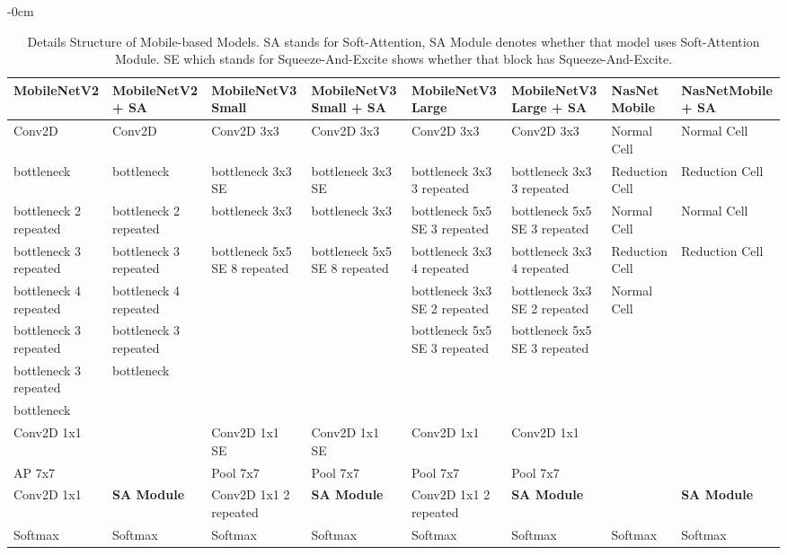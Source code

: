 \documentclass[sensors,article,submit,pdftex,moreauthors]{Definitions/mdpi}
\begin{document}
	\begin{table}[H]
		\begin{adjustwidth}{-\extralength}{0cm}
			\begin{tabularx}{\fulllength}{p{1.8cm} | p{1.8cm} | p{1.9cm} | p{1.9cm} | p{1.9cm} | p{1.8cm} | p{1.8cm} | p{1.9cm}}
				\toprule
				\textbf{MobileNetV2} & \textbf{MobileNetV2 + SA} & \textbf{MobileNetV3 Small} & \textbf{MobileNetV3 Small + SA} & \textbf{MobileNetV3 Large} & \textbf{MobileNetV3 Large + SA} & \textbf{NasNet Mobile} & \textbf{NasNetMobile + SA}\\
				\midrule
				Conv2D & Conv2D& Conv2D 3x3& Conv2D 3x3& Conv2D 3x3& Conv2D 3x3 & Normal Cell & Normal Cell\\	\hline		
				bottleneck & bottleneck & bottleneck 3x3 SE& bottleneck 3x3 SE& bottleneck 3x3 3 repeated& bottleneck 3x3 3 repeated& Reduction Cell& Reduction Cell\\ \hline					
				bottleneck 2 repeated& bottleneck 2 repeated& bottleneck 3x3& bottleneck 3x3& bottleneck 5x5 SE 3 repeated& bottleneck 5x5 SE 3 repeated & Normal Cell & Normal Cell\\ \hline	
				bottleneck 3 repeated& bottleneck 3 repeated& bottleneck 5x5 SE 8 repeated& bottleneck 5x5 SE 8 repeated& bottleneck 3x3 4 repeated& bottleneck 3x3 4 repeated& Reduction Cell & Reduction Cell\\ \hline	
				bottleneck 4 repeated& bottleneck 4 repeated& & & bottleneck 3x3 SE 2 repeated& bottleneck 3x3 SE 2 repeated & Normal Cell\\ \hline	
				bottleneck 3 repeated& bottleneck 3 repeated& & & bottleneck 5x5 SE 3 repeated& bottleneck 5x5 SE 3 repeated& \\ \hline	
				bottleneck 3 repeated& bottleneck & & & & & \\ \hline	
				bottleneck & & & & & & \\ \hline
				Conv2D 1x1 & & Conv2D 1x1 SE & Conv2D 1x1 SE& Conv2D 1x1& Conv2D 1x1 & & \\ \hline
				AP 7x7 & & Pool 7x7& Pool 7x7& Pool 7x7& Pool 7x7& &\\ \hline
				Conv2D 1x1 & \textbf{SA Module}& Conv2D 1x1 2 repeated& \textbf{SA Module}& Conv2D 1x1 2 repeated& \textbf{SA Module}& &\textbf{SA Module}\\ \hline
				Softmax & Softmax& Softmax& Softmax& Softmax& Softmax& Softmax & Softmax\\ 
				\bottomrule
			\end{tabularx}
		\end{adjustwidth}
		\caption{Details Structure of Mobile-based Models. SA stands for Soft-Attention, SA Module denotes whether that model uses Soft-Attention Module. SE which stands for Squeeze-And-Excite shows whether that block has Squeeze-And-Excite. \label{appendix-table:detailed mobile model structure}}
	\end{table}
	
\end{document}
